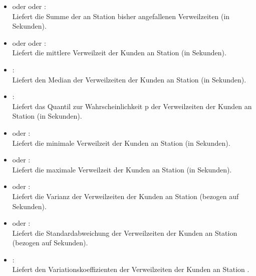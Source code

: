 \begin{itemize}

\item {} oder  oder :\\
Liefert die Summe der an Station  bisher angefallenen Verweilzeiten (in Sekunden).

\item
{} oder  oder :\\
Liefert die mittlere Verweilzeit der Kunden an Station  (in Sekunden).

\item
{}:\\
Liefert den Median der Verweilzeiten der Kunden an Station  (in Sekunden).

\item
{}:\\
Liefert das Quantil zur Wahrscheinlichkeit p der Verweilzeiten der Kunden an Station  (in Sekunden).

\item
{} oder :\\  
Liefert die minimale Verweilzeit der Kunden an Station  (in Sekunden).

\item
{} oder :\\
Liefert die maximale Verweilzeit der Kunden an Station  (in Sekunden).

\item
{} oder :\\
Liefert die Varianz der Verweilzeiten der Kunden an Station  (bezogen auf Sekunden).

\item
{} oder :\\
Liefert die Standardabweichung der Verweilzeiten der Kunden an Station  (bezogen auf Sekunden).

\item
{}:\\
Liefert den Variationskoeffizienten der Verweilzeiten der Kunden an Station .


\end{itemize}
